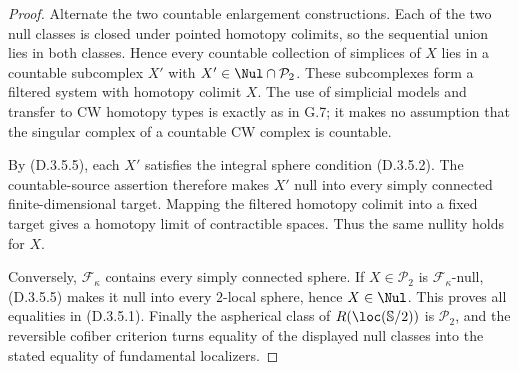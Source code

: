\begin{proof}
Alternate the two countable enlargement constructions.
Each of the two null classes is closed under pointed
homotopy colimits, so the sequential union lies in both
classes. Hence every countable collection of simplices
of $X$ lies in a countable subcomplex $X'$ with
$X'\in\Nul\cap\mathcal P_2$. These subcomplexes form
a filtered system with homotopy colimit $X$. The use of
simplicial models and transfer to CW homotopy types is
exactly as in G.7; it makes no assumption that the
singular complex of a countable CW complex is countable.

By (D.3.5.5), each $X'$ satisfies the integral sphere
condition (D.3.5.2). The countable-source assertion
therefore makes $X'$ null into every simply connected
finite-dimensional target. Mapping the filtered homotopy
colimit into a fixed target gives a homotopy limit of
contractible spaces. Thus the same nullity holds for $X$.

Conversely, $\mathcal F_\kappa$ contains every simply
connected sphere. If $X\in\mathcal P_2$ is
$\mathcal F_\kappa$-null, (D.3.5.5) makes it null into
every $2$-local sphere, hence $X\in\Nul$. This proves
all equalities in (D.3.5.1). Finally the aspherical class
of $R(\loc(\mathbb S/2))$ is $\mathcal P_2$, and the
reversible cofiber criterion turns equality of the
displayed null classes into the stated equality of
fundamental localizers.
\end{proof}
